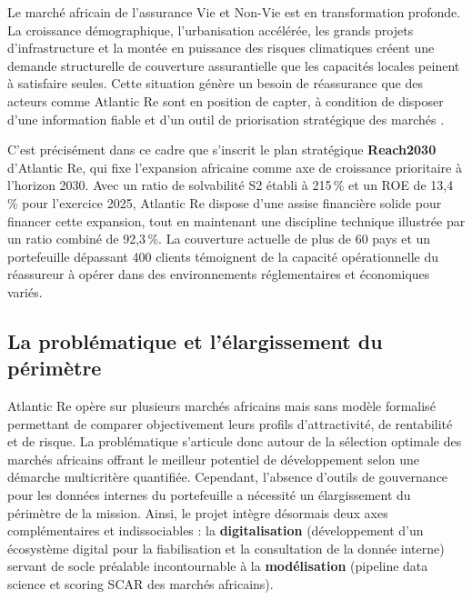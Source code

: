 \documentclass[../main.tex]{subfiles}
\begin{document}
Le marché africain de l'assurance Vie et Non-Vie est en transformation profonde. La
croissance démographique, l'urbanisation accélérée, les grands projets d'infrastructure
et la montée en puissance des risques climatiques créent une demande structurelle
de couverture assurantielle que les capacités locales peinent à satisfaire seules.
Cette situation génère un besoin de réassurance que des acteurs comme Atlantic Re
sont en position de capter, à condition de disposer d'une information fiable et
d'un outil de priorisation stratégique des marchés \citep{Guerard2021}.

C'est précisément dans ce cadre que s'inscrit le plan stratégique \textbf{Reach2030}
d'Atlantic Re, qui fixe l'expansion africaine comme axe de croissance prioritaire à
l'horizon 2030. Avec un ratio de solvabilité S2 établi à 215\,\% et un ROE de
13,4\,\% pour l'exercice 2025, Atlantic Re dispose d'une assise financière solide
pour financer cette expansion, tout en maintenant une discipline technique illustrée
par un ratio combiné de 92,3\,\%. La couverture actuelle de plus de 60 pays et un
portefeuille dépassant 400 clients témoignent de la capacité opérationnelle du
réassureur à opérer dans des environnements réglementaires et économiques variés.

\subsection{La problématique et l'élargissement du périmètre}

Atlantic Re opère sur plusieurs marchés africains mais sans modèle formalisé
permettant de comparer objectivement leurs profils d'attractivité, de rentabilité
et de risque. La problématique s'articule donc autour de la sélection optimale
des marchés africains offrant le meilleur potentiel de développement selon une
démarche multicritère quantifiée. Cependant, l'absence d'outils de gouvernance
pour les données internes du portefeuille a nécessité un élargissement du
périmètre de la mission. Ainsi, le projet intègre désormais deux axes
complémentaires et indissociables : la \textbf{digitalisation} (développement
d'un écosystème digital pour la fiabilisation et la consultation de la donnée interne)
servant de socle préalable incontournable à la \textbf{modélisation} (pipeline
data science et scoring SCAR des marchés africains).

\end{document}
